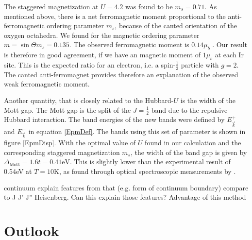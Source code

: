 \documentclass[a4paper,12pt]{report}
\begin{document}
The staggered magnetization at $U=4.2$ was found to be $m_s= 0.71$. 
As mentioned above, there is a net ferromagnetic moment proportional to the anti-ferromagnetic ordering 
parameter $m_s$, because of the canted orientation of the oxygen octahedra. 
We found for the magnetic ordering parameter $m =  \sin \Theta m_s= 0.135$. 
The observed ferromagnetic moment is $0.14\mu_b$ \cite{PhysRevB.57.R11039}. 
Our result is therefore in good agreement, if we have an magnetic moment of $1\mu_b$ at each Ir site. 
This is the expected ratio for an electron, i.e. a spin-$\frac12$ particle with $g=2$.
The canted anti-ferromagnet provides therefore an explanation of the observed weak ferromagnetic moment. 

Another quantity, that is closely related to the Hubbard-$U$ is the width of the Mott gap.
The Mott gap is the split of the $J=\frac12$-band due to the repulsive Hubbard interaction.
The band energies of the new bands were defined by $E^+_{\vec k}$ and $E^-_{\vec k}$ in equation \ref{EpmDef}.
The bands using this set of parameter is shown in figure \ref{EpmDisp}.
With the optimal value of $U$ found in  our calculation and the corresponding staggered magnetization $m_s$, 
the width of the band gap is given by $\Delta_{\mathrm{Mott}}=1.6t=0.41\mathrm{eV}$.
This is slightly lower than the experimental result of 0.54eV  at $T=10$K,
as found through optical spectroscopic measurements by \citet{PhysRevB.80.195110}.



continuum
explain features from that (e.g. form of continuum boundary)
compare to J-J'-J'' Heisenberg. Can this explain those features? Advantage of this method








\section{Outlook}

% 
\end{document}
